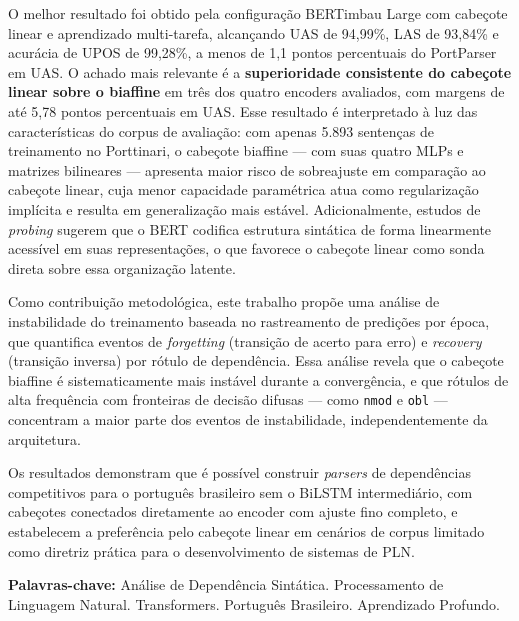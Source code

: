 O melhor resultado foi obtido pela configuração BERTimbau Large com cabeçote linear e
aprendizado multi-tarefa, alcançando UAS de 94,99\%, LAS de 93,84\% e acurácia de UPOS de
99,28\%, a menos de 1,1 pontos percentuais do PortParser em UAS. O achado mais relevante é a
\textbf{superioridade consistente do cabeçote linear sobre o biaffine} em três dos quatro
encoders avaliados, com margens de até 5,78 pontos percentuais em UAS. Esse resultado é
interpretado à luz das características do corpus de avaliação: com apenas 5.893 sentenças de
treinamento no Porttinari, o cabeçote biaffine — com suas quatro MLPs e matrizes bilineares —
apresenta maior risco de sobreajuste em comparação ao cabeçote linear, cuja menor capacidade
paramétrica atua como regularização implícita e resulta em generalização mais estável.
Adicionalmente, estudos de \textit{probing} sugerem que o BERT codifica estrutura sintática
de forma linearmente acessível em suas representações, o que favorece o cabeçote linear como
sonda direta sobre essa organização latente.

Como contribuição metodológica, este trabalho propõe uma análise de instabilidade do
treinamento baseada no rastreamento de predições por época, que quantifica eventos de
\textit{forgetting} (transição de acerto para erro) e \textit{recovery} (transição inversa)
por rótulo de dependência. Essa análise revela que o cabeçote biaffine é sistematicamente mais
instável durante a convergência, e que rótulos de alta frequência com fronteiras de decisão
difusas — como \texttt{nmod} e \texttt{obl} — concentram a maior parte dos eventos de
instabilidade, independentemente da arquitetura.

Os resultados demonstram que é possível construir \textit{parsers} de dependências competitivos
para o português brasileiro sem o BiLSTM intermediário, com cabeçotes conectados diretamente
ao encoder com ajuste fino completo, e estabelecem a preferência pelo cabeçote linear em
cenários de corpus limitado como diretriz prática para o desenvolvimento de sistemas de PLN.

\bigskip
\noindent\textbf{Palavras-chave:} Análise de Dependência Sintática. Processamento de Linguagem
Natural. Transformers. Português Brasileiro. Aprendizado Profundo.


%
%

